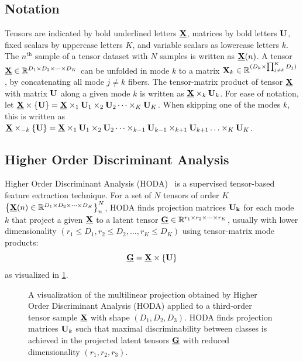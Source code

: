 \subsection{Notation}
Tensors are indicated by bold underlined letters $\ten{X}$, matrices by bold
letters $\mat{U}$, fixed scalars by uppercase letters $K$, and variable
scalars as lowercase letters $k$.
The $n^\text{th}$ sample of a tensor dataset with $N$ samples is written as
$\ten{X}(n)$.
A tensor $\ten{X}\in \mathbb{R}^{D_1\times D_2 \times \cdots \times D_K}$ can be
unfolded in mode $k$ to a matrix
$\mat{X}_k\in\mathbb{R}^{(D_k\times\prod_{j\neq k}^K D_j)}$, by concatenating
all mode $j\neq k$ fibers.
The tensor-matrix product of tensor $\ten{X}$ with matrix $\mat{U}$ along a
given mode $k$ is written as $\ten{X}\mpr{\mat{U}}{k}$. For ease of notation, let
$\ten{X}\mmpr{\mat{U}} =
	\ten{X}\mpr{\mat{U}}{1}\mpr{\mat{U}}{2}\cdots\mpr{\mat{U}}{K}$.
When skipping one of the modes $k$, this is
written as $\ten{X}\mmprs{\mat{U}}{k} =
	\ten{X}\mpr{\mat{U}}{1}\mpr{\mat{U}}{2}\cdots\mpr{\mat{U}}{k-1}\mpr{\mat{U}}{k+1}\ldots\mpr{\mat{U}}{K}$.

\subsection{Higher Order Discriminant Analysis}
Higher Order Discriminant Analysis (HODA)~\cite{Phan2010} is a
supervised tensor-based feature extraction technique.
For a set of $N$ tensors of order $K$
$\left\{\ten{X}(n)\in\mathbb{R}^{D_1\times D_2 \times \cdots \times
		D_K}\right\}_n^N$, HODA finds projection matrices $\mat{U_k}$ for each mode $k$
that project a given $\ten{X}$ to a latent tensor
$\ten{G}\in\mathbb{R}^{r_1\times r_2\times\cdots\times r_K}$, usually with lower
dimensionality $(r_1\leq D_1,r_2\leq D_2,\ldots,r_K\leq D_K)$ using
tensor-matrix mode products:
\begin{equation}
	\ten{G}  = \ten{X}\mmpr{\mat{U}}
	\label{eq:HODA-backward}
\end{equation}
as visualized in \cref{fig:HODA-backward}.
\begin{figure}[t]
	\centering
	
  \caption[A \acs{hoda} backward projection.]{%
    A visualization of the multilinear projection obtained by Higher Order
    Discriminant Analysis (HODA) applied to a third-order tensor
    sample $\ten{X}$ with shape $(D_1,D_2, D_3)$.
		HODA finds projection matrices $\mat{U}_k$ such that maximal
		discriminability between classes is achieved in the projected latent tensors
		$\ten{G}$ with reduced dimensionality $(r_1,r_2,r_3)$.}
	\label{fig:HODA-backward}
\end{figure}

